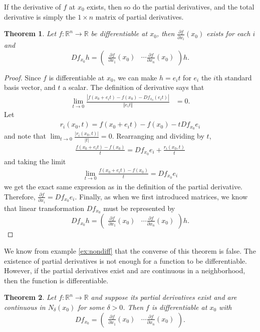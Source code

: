 \documentclass[12pt,reqno]{amsart}
\newtheorem{theorem}{Theorem}[section]
\theoremstyle{definition}
\def\R{\mathbb{R}}
\newcommand{\norm}[1]{\left\Vert {#1} \right\Vert}
\renewcommand{\to}{{\rightarrow}}
\begin{document}
If the derivative of $f$ at $x_0$ exists, then so do the partial
derivatives, and the total derivative is simply the $1 \times n$
matrix of partial derivatives.
\begin{theorem}\label{thm:tdiff}
  Let $f: \R^n \to \R$ be differentiable at $x_0$, then
  $\frac{\partial f}{\partial x_i}(x_0)$ exists for each $i$ and 
  \[ Df_{x_0} h = \begin{pmatrix} \frac{ \partial f}{\partial x_1}(x_0) &
    \cdots \frac{ \partial f}{\partial x_n }(x_0)
  \end{pmatrix} h. \]
\end{theorem}
\begin{proof}
  Since $f$ is differentiable at $x_0$, we can make $h = e_i t$ for
  $e_i$ the $i$th standard basis vector, and $t$ a scalar. The
  definition of derivative says that
  \begin{align*}
    \lim_{t \to 0} \frac{\left|f(x_0 + e_i t) - f(x_0) - Df_{x_0} (e_i t)\right|}
    {\norm{e_i t} } & = 0.
  \end{align*}
  Let 
  \begin{align*}
    r_i(x_0,t) = f(x_0 + e_i t) - f(x_0) - t D f_{x_0} e_i 
  \end{align*}
  and note that $\lim_{t \to 0} \frac{|r_i(x_0,t)|}{|t|} =
  0$. Rearranging and dividing by $t$, 
  \begin{align*}
    \frac{f(x_0 + e_i t) - f(x_0)}{t} = D f_{x_0} e_i + \frac{r_i(x_0,t)}{t}
  \end{align*}
  and taking the limit
  \begin{align*}
    \lim_{t \to 0} \frac{f(x_0 + e_i t) - f(x_0)}{t} = D f_{x_0} e_i 
  \end{align*}
  we get the exact same expression as in the definition of the partial
  derivative. Therefore, $\frac{\partial f}{\partial x_i} = D
  f_{x_0}e_i$. Finally, as when we first introduced matrices, we know
  that linear transformation $D f_{x_0}$ must be represented by
  \[ Df_{x_0} h = \begin{pmatrix} \frac{ \partial f}{\partial x_1}(x_0) &
    \cdots \frac{ \partial f}{\partial x_n }(x_0)
  \end{pmatrix} h. \]
\end{proof}
We know from example \ref{ex:nondiff} that the converse of this
theorem is false. The existence of partial derivatives is not enough
for a function to be differentiable. However, if the partial
derivatives exist and are continuous in a neighborhood, then the
function is differentiable. 
\begin{theorem}\label{thm:ptdiff}
  Let $f:\R^n \to \R$ and suppose its partial derivatives exist and
  are continuous in $N_\delta(x_0)$ for some $\delta>0$. Then $f$
  is differentiable at $x_0$ with 
  \[ Df_{x_0}= \begin{pmatrix} \frac{ \partial f}{\partial x_1}(x_0) &
    \cdots \frac{ \partial f}{\partial x_n }(x_0)
  \end{pmatrix}. \]
\end{theorem}
\end{document}
